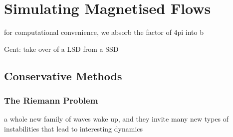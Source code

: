 \section{Simulating Magnetised Flows}
\label{sec:sims}

for computational convenience, we absorb the factor of 4pi into b

Gent: take over of a LSD from a SSD

\subsection{Conservative Methods}
\label{sec:sims:godunov}

\subsubsection{The Riemann Problem}
\label{sec:sims:riemann}

a whole new family of waves wake up, and they invite many new types of instabilities that lead to interesting dynamics 

